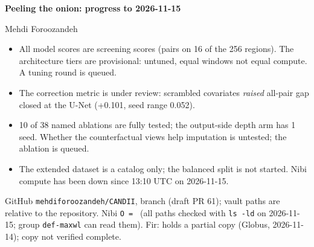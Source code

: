 \documentclass[10pt,letterpaper]{article}
\newcommand{\cl}[1]{#1}
\begin{document}
{\Large\bfseries Peeling the onion: progress to 2026-11-15}\par
{\normalsize Mehdi Foroozandeh}

\begin{tcolorbox}[enhanced,colback=orange!6,colframe=orange!60!black,boxrule=0.5pt,arc=1pt,left=3pt,right=3pt,top=1pt,bottom=1pt,fontupper=\small,before skip=4pt,after skip=4pt]
\cl{\begin{itemize}
\item All model scores are screening scores (pairs on 16 of the 256 regions). The architecture tiers are provisional: untuned, equal windows not equal compute. A tuning round is queued.
\item The correction metric is under review: scrambled covariates \emph{raised} all-pair gap closed at the U-Net (+0.101, seed range 0.052).
\item 10 of 38 named ablations are fully tested; the output-side depth arm has 1 seed. Whether the counterfactual views help imputation is untested; the ablation is queued.
\item The extended dataset is a catalog only; the balanced split is not started. Nibi compute has been down since 13:10 UTC on 2026-11-15.
\end{itemize}}
\end{tcolorbox}

\begin{where}
GitHub \texttt{mehdiforoozandeh/CANDII}, branch  (draft PR 61); vault paths are relative to the repository.
Nibi \texttt{O = } (all paths checked with \texttt{ls -ld} on 2026-11-15; group \texttt{def-maxwl} can read them).
Fir:  holds a partial copy (Globus, 2026-11-14); copy not verified complete.
\end{where}

\end{document}
